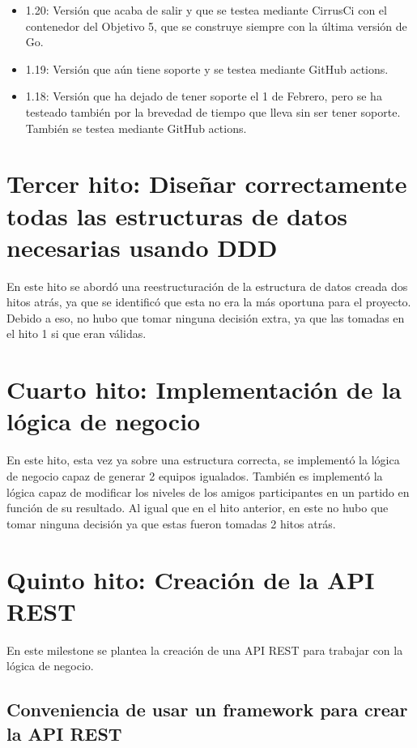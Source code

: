 \begin{itemize}
\item
  1.20: Versión que acaba de salir y que se testea mediante CirrusCi con
  el contenedor del Objetivo 5, que se construye siempre con la última
  versión de Go.
\item
  1.19: Versión que aún tiene soporte y se testea mediante GitHub
  actions.
\item
  1.18: Versión que ha dejado de tener soporte el 1 de Febrero, pero se
  ha testeado también por la brevedad de tiempo que lleva sin ser tener
  soporte. También se testea mediante GitHub actions.
\end{itemize}

\section{Tercer hito:  Diseñar correctamente todas las estructuras de datos necesarias usando DDD}

En este hito se abordó una reestructuración de la estructura de datos creada dos hitos atrás, ya que se identificó que esta no era 
la más oportuna para el proyecto. Debido a eso, no hubo que tomar ninguna decisión extra, ya que las tomadas en el hito 1 si que eran válidas.

\section{Cuarto hito: Implementación de la lógica de negocio}

En este hito, esta vez ya sobre una estructura correcta, se implementó la lógica de negocio capaz de generar 2 equipos igualados.
También es implementó la lógica capaz de modificar los niveles de los amigos participantes en un partido en función de su resultado.
Al igual que en el hito anterior, en este no hubo que tomar ninguna decisión ya que estas fueron tomadas 2 hitos atrás.

\newpage
\section{Quinto hito: Creación de la API REST}

En este milestone se plantea la creación de una API REST para trabajar con la lógica de negocio.

\subsection{Conveniencia de usar un framework para crear la API REST}

